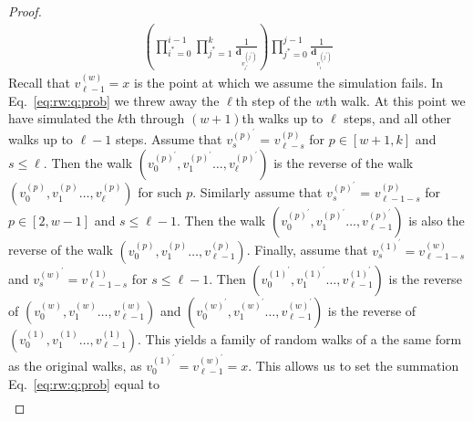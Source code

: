 \documentclass{report}
\begin{document}
\begin{proof}
\begin{align}
\left ( 
	\prod_{i^* = 0}^{i-1}  
	\prod_{j^*= 1}^{k} 
		\frac{1}{\mathbf{d}_{v_{i^*}^{(j^*)}}} 
\right ) 
\prod_{j^* = 0}^{j -1}  \frac{1}{\mathbf{d}_{v_{i}^{(j^*)}}}
\end{align}
%
Recall that $v_{\ell-1}^{(w)} = x$ is the point at which we assume the simulation fails.
In Eq.~\eqref{eq:rw:q:prob} we threw away the $\ell$th step of the $w$th walk. 
At this point we have simulated the $k$th through $(w+1)$th walks up to $\ell$ steps, and all other walks up to $\ell-1$ steps.
Assume that $v^{(p)^\prime}_s$ = $v^{(p)}_{\ell - s}$ for $p \in [w+1, k]$ and $s \leq \ell$.
Then the walk $\left ( v_0^{(p)^\prime}, v_1^{(p)^\prime} \dots, v_\ell^{(p)^\prime} \right )$ is the reverse of the walk $\left ( v_0^{(p)}, v_1^{(p)} \dots, v_\ell^{(p)} \right )$ for such $p$.
Similarly assume that $v^{(p)^\prime}_s$ = $v^{(p)}_{\ell -1 - s}$ for $p \in [2, w-1]$ and $s \leq \ell-1$.
Then the walk $	\left ( v_0^{(p)^\prime}, v_1^{(p)^\prime} \dots, v_{\ell-1}^{(p)^\prime} \right )$ is also the reverse of the walk $\left ( v_0^{(p)}, v_{1}^{(p)} \dots, v_{\ell-1}^{(p)} \right )$.
Finally, assume that $v^{(1)^\prime}_s = v^{(w)}_{\ell -1 - s}$ and $v^{(w)^\prime}_s = v^{(1)}_{\ell -1 - s}$ for $s \leq \ell-1$.
Then $\left ( v_0^{(1)^\prime}, v_1^{(1)^\prime} \dots, v_{\ell-1}^{(1)^\prime} \right )$ is the reverse of $\left ( v_0^{(w)}, v_{1}^{(w)} \dots, v_{\ell-1}^{(w)} \right )$ and $\left ( v_0^{(w)^\prime}, v_1^{(w)^\prime} \dots, v_{\ell-1}^{(w)^\prime} \right )$ is the reverse of $\left ( v_0^{(1)}, v_{1}^{(1)} \dots, v_{\ell-1}^{(1)} \right )$.
This yields a family of random walks of a the same form as the original walks, as $v_0^{(1)^\prime} = v_{\ell - 1}^{(w)^\prime} = x$.
This allows us to set the summation Eq.~\eqref{eq:rw:q:prob} equal to 
%
\begin{align}

\end{align}
\end{proof}
\end{document}
